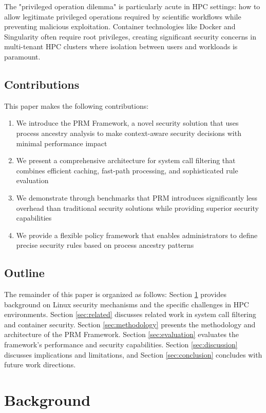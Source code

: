 \documentclass[conference]{IEEEtran}
\begin{document}
The "privileged operation dilemma" is particularly acute in HPC settings: how to allow legitimate privileged operations required by scientific workflows while preventing malicious exploitation. Container technologies like Docker and Singularity often require root privileges, creating significant security concerns in multi-tenant HPC clusters where isolation between users and workloads is paramount.

\subsection{Contributions}
This paper makes the following contributions:
\begin{enumerate}
\item We introduce the PRM Framework, a novel security solution that uses process ancestry analysis to make context-aware security decisions with minimal performance impact
\item We present a comprehensive architecture for system call filtering that combines efficient caching, fast-path processing, and sophisticated rule evaluation
\item We demonstrate through benchmarks that PRM introduces significantly less overhead than traditional security solutions while providing superior security capabilities
\item We provide a flexible policy framework that enables administrators to define precise security rules based on process ancestry patterns
\end{enumerate}

\subsection{Outline}
The remainder of this paper is organized as follows: Section \ref{sec:background} provides background on Linux security mechanisms and the specific challenges in HPC environments. Section \ref{sec:related} discusses related work in system call filtering and container security. Section \ref{sec:methodology} presents the methodology and architecture of the PRM Framework. Section \ref{sec:evaluation} evaluates the framework's performance and security capabilities. Section \ref{sec:discussion} discusses implications and limitations, and Section \ref{sec:conclusion} concludes with future work directions.

\section{Background}
\label{sec:background}
\end{document}
